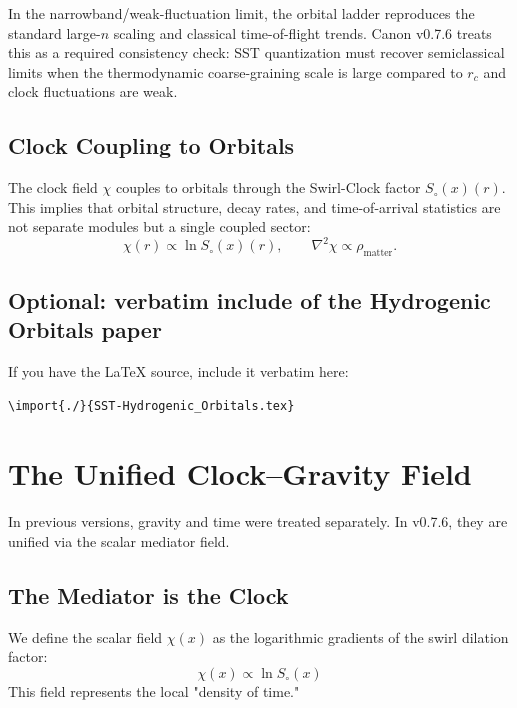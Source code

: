 \documentclass[10pt]{article}
\newcommand{\clockfield}{\chi(x)}
\newcommand{\swirlfactor}{S_\circ(x)}
\begin{document}
In the narrowband/weak-fluctuation limit, the orbital ladder reproduces the
standard large-$n$ scaling and classical time-of-flight trends. Canon v0.7.6
treats this as a required consistency check: SST quantization must recover
semiclassical limits when the thermodynamic coarse-graining scale is large
compared to $r_c$ and clock fluctuations are weak.

\subsection{Clock Coupling to Orbitals}

The clock field $\chi$ couples to orbitals through the Swirl-Clock factor
$\swirlfactor(r)$. This implies that orbital structure, decay rates, and
time-of-arrival statistics are not separate modules but a single coupled sector:
\begin{equation}
    \chi(r) \propto \ln \swirlfactor(r),
    \qquad
    \nabla^2\chi \propto \rho_{\mathrm{matter}}.
\end{equation}

\subsection{Optional: verbatim include of the Hydrogenic Orbitals paper}

If you have the LaTeX source, include it verbatim here:
\begin{center}
\texttt{\textbackslash import\{./\}\{SST-Hydrogenic\_Orbitals.tex\}}
\end{center}

    \section{The Unified Clock--Gravity Field}

    In previous versions, gravity and time were treated separately. In v0.7.6, they are unified via the scalar mediator field.

    \subsection{The Mediator is the Clock}
        We define the scalar field $\clockfield$ as the logarithmic gradients of the swirl dilation factor:
        \begin{equation}
            \chi(x) \propto \ln S_\circ(x)
        \end{equation}
        This field represents the local "density of time."
\end{document}
